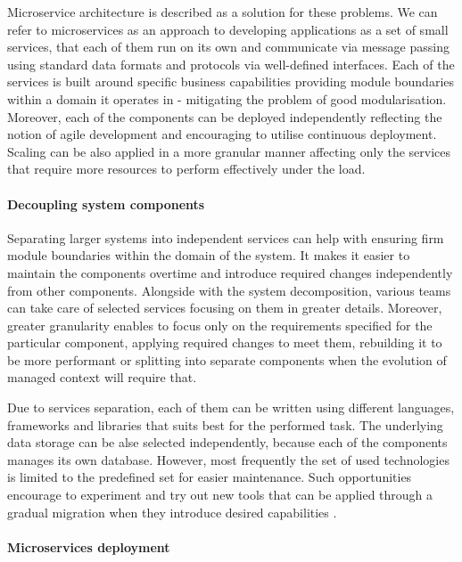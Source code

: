 Microservice architecture is described as a solution for these problems. We can refer to microservices as an approach to developing applications as a set of small services, that each of them run on its own and communicate via message passing using standard data formats and protocols via well-defined interfaces. Each of the services is built around specific business capabilities providing module boundaries within a domain it operates in - mitigating the problem of good modularisation. Moreover, each of the components can be deployed independently reflecting the notion of agile development and encouraging to utilise continuous deployment. Scaling can be also applied in a more granular manner affecting only the services that require more resources to perform effectively under the load. \cite{FowlerMicroservices}

\paragraph{Decoupling system components}

Separating larger systems into independent services can help with ensuring firm module boundaries within the domain of the system. It makes it easier to maintain the components overtime and introduce required changes independently from other components. Alongside with the system decomposition, various teams can take care of selected services focusing on them in greater details. Moreover, greater granularity enables to focus only on the requirements specified for the particular component, applying required changes to meet them, rebuilding it to be more performant or splitting into separate components when the evolution of managed context will require that.

Due to services separation, each of them can be written using different languages, frameworks and libraries that suits best for the performed task. The underlying data storage can be alse selected independently, because each of the components manages its own database. However, most frequently the set of used technologies is limited to the predefined set for easier maintenance. Such opportunities encourage to experiment and try out new tools that can be applied through a gradual migration when they introduce desired capabilities \cite{FowlerMicroservicesTradeoffs}.

\paragraph{Microservices deployment}

